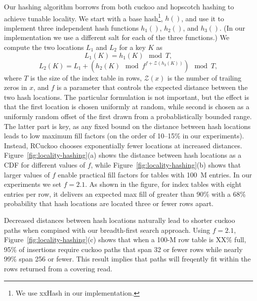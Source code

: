 Our hashing algorithm borrows from both cuckoo and hopscotch hashing
to achieve tunable locality.   We start with a base
hash\footnote{We use xxHash in our implementation.}, $h()$, and use it to
implement three independent hash functions $h_1()$, $h_2()$, and $h_3()$.
(In our implementation we use a different salt for each of the
three functions.)  We compute the two locations $L_1$ and $L_2$
for a key $K$ as
\[ L_1(K) = h_1(K)\mod T, \]
\[ L_2(K) = L_1 + (h_2(K)\mod f^{f+\mathcal{Z}(h_3(K))})\mod T, \]
\noindent where $T$ is the size of the index table in rows,
$\mathcal{Z}(x)$ is the number of trailing zeros in $x$, and $f$ is a
parameter that controls the expected distance between the two hash
locations.  The particular formulation is not important, but the
effect is that the first location is chosen uniformly at random, while
second is chosen as a uniformly random offset of the first drawn from
a probablistically bounded range.  The latter part is key, as any
fixed bound on the distance between hash locations leads to
low maximum fill factors (on the order of 10--15\% in our
experiments).  Instead, RCuckoo chooses exponentially fewer locations
at increased distances.  Figure~\ref{fig:locality-hashing}(a) shows
the distance between hash locations as a CDF for different values of
$f$,
while Figure~\ref{fig:locality-hashing}(b) shows that larger values of
$f$ enable practical fill factors for tables with 100~M entries. In
our experiments we set $f=2.1$.  As shown in the figure, for index
tables with eight entries per row, it delivers an expected max fill of
greater than 90\% with a 68\% probability that hash locations are
located three or fewer rows apart.

Decreased distances between hash locations naturally lead to shorter
cuckoo paths when compined with our breadth-first search approach.
Using $f=2.1$, Figure~\ref{fig:locality-hashing}(c) shows that when a
100-M row table is XX\% full, 95\% of insertions require cuckoo paths
that span 32 or fewer rows while nearly 99\% span 256 or fewer.  This
result implies that paths will freqently fit within the rows returned from a
covering read.

